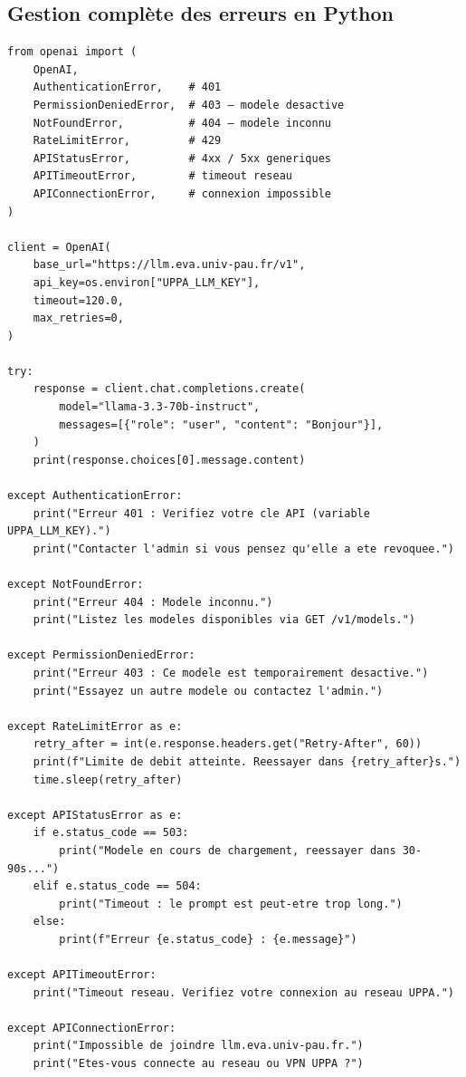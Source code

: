 \documentclass[12pt, a4paper, twoside]{article}
\begin{document}
\subsection{Gestion complète des erreurs en Python}

\begin{lstlisting}[style=pythonstyle, caption={Gestion exhaustive des erreurs avec openai-python}]
from openai import (
    OpenAI,
    AuthenticationError,    # 401
    PermissionDeniedError,  # 403 — modele desactive
    NotFoundError,          # 404 — modele inconnu
    RateLimitError,         # 429
    APIStatusError,         # 4xx / 5xx generiques
    APITimeoutError,        # timeout reseau
    APIConnectionError,     # connexion impossible
)

client = OpenAI(
    base_url="https://llm.eva.univ-pau.fr/v1",
    api_key=os.environ["UPPA_LLM_KEY"],
    timeout=120.0,
    max_retries=0,
)

try:
    response = client.chat.completions.create(
        model="llama-3.3-70b-instruct",
        messages=[{"role": "user", "content": "Bonjour"}],
    )
    print(response.choices[0].message.content)

except AuthenticationError:
    print("Erreur 401 : Verifiez votre cle API (variable UPPA_LLM_KEY).")
    print("Contacter l'admin si vous pensez qu'elle a ete revoquee.")

except NotFoundError:
    print("Erreur 404 : Modele inconnu.")
    print("Listez les modeles disponibles via GET /v1/models.")

except PermissionDeniedError:
    print("Erreur 403 : Ce modele est temporairement desactive.")
    print("Essayez un autre modele ou contactez l'admin.")

except RateLimitError as e:
    retry_after = int(e.response.headers.get("Retry-After", 60))
    print(f"Limite de debit atteinte. Reessayer dans {retry_after}s.")
    time.sleep(retry_after)

except APIStatusError as e:
    if e.status_code == 503:
        print("Modele en cours de chargement, reessayer dans 30-90s...")
    elif e.status_code == 504:
        print("Timeout : le prompt est peut-etre trop long.")
    else:
        print(f"Erreur {e.status_code} : {e.message}")

except APITimeoutError:
    print("Timeout reseau. Verifiez votre connexion au reseau UPPA.")

except APIConnectionError:
    print("Impossible de joindre llm.eva.univ-pau.fr.")
    print("Etes-vous connecte au reseau ou VPN UPPA ?")
\end{lstlisting}
\end{document}
